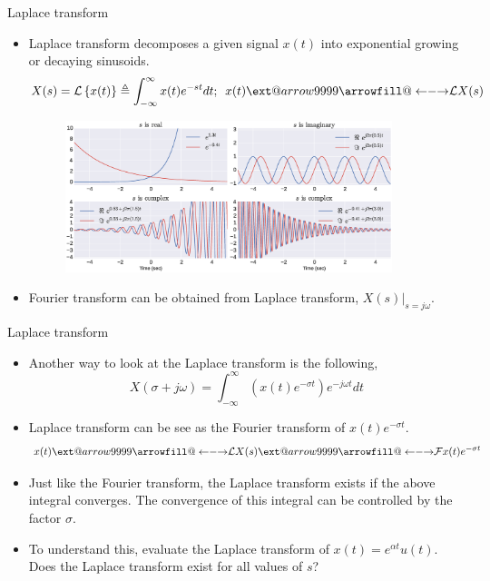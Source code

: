 \documentclass{beamer}
\makeatletter
\newcommand\xleftrightarrow[2][]{%
  \ext@arrow 9999{\longleftrightarrowfill@}{#1}{#2}}
\newcommand\longleftrightarrowfill@{%
  \arrowfill@\leftarrow\relbar\rightarrow}
\makeatother
\begin{document}
\begin{frame}{Laplace transform}

\begin{itemize}
\item Laplace transform decomposes a given signal $x(t)$ into exponential growing or decaying sinusoids.
\[ X(s) = \mathcal{L}\left\lbrace x(t) \right\rbrace \triangleq \int_{-\infty}^{\infty}x(t)e^{-st}dt; \,\,\, x(t) \xleftrightarrow{\mathcal{L}} X(s) \]

\vspace{-5mm}
\begin{figure}
\includegraphics[width=0.9\textwidth]{img/complex_exp.eps}
\end{figure}

\item Fourier transform can be obtained from Laplace transform, $X(s)\Big|_{s=j\omega}$.
\end{itemize}
\end{frame}

\begin{frame}{Laplace transform}

\begin{itemize}
\item Another way to look at the Laplace transform is the following,
\[ X(\sigma + j\omega) = \int_{-\infty}^{\infty}\left(x(t)e^{-\sigma t}\right) e^{-j\omega t}dt \]
\item Laplace transform can be see as the Fourier transform of $x(t)e^{-\sigma t}$. 
$$x(t) \xleftrightarrow{\mathcal{L}} X(s) \xleftrightarrow{\mathcal{F}} x(t)e^{-\sigma t}$$ 
\item Just like the Fourier transform, the Laplace transform exists if the above integral converges. The convergence of this integral can be controlled by the factor $\sigma$.
\item To understand this, evaluate the Laplace transform of $x(t) = e^{\alpha t}u(t)$. Does the Laplace transform exist for all values of $s$?
\end{itemize}
\end{frame}
\end{document}
